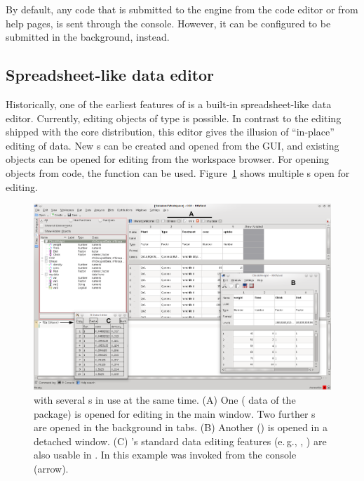 By default, any code that is submitted to the
 engine from the code editor or from help
pages, is sent through the  console.
However, it can be configured to be submitted in the background,
instead.


\subsection{Spreadsheet-like data editor}
\label{sec:spreadsheet}

Historically, one of the earliest
features of  is a built-in spreadsheet-like data editor.
Currently, editing  objects of type
 is possible. In contrast to the  editing shipped
with the  core distribution, this editor
gives the illusion of ``in-place'' editing of data. New s can
be created and opened from the GUI, and existing objects can be opened
for editing from the workspace browser. For opening objects from
 code, the function  can be used.
Figure~\ref{fig:data_editors} shows multiple s open for editing.

\begin{figure}[t!]
 \centering
 \includegraphics[width=15.5cm]{./figures/data_editors.png}
 \caption{ with several s in use at the same time. (A) 
  One  ( data of the  package) is opened for editing in the main window. Two further s
  are opened in the background in tabs. 
  (B) Another  () is opened in a detached window. 
  (C) 's standard data editing features (e.\,g., , ) 
  are also usable in . In this example  
  was invoked from the console (arrow).}
 \label{fig:data_editors}
\end{figure}

